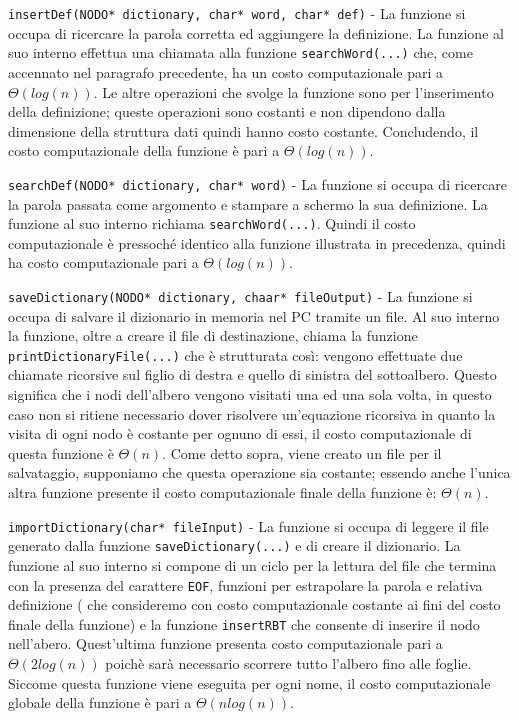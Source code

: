 \documentclass[paper=a4, fontsize=11pt,twoside]{scrartcl}   %
\begin{document}
				\texttt{insertDef(NODO* dictionary, char* word, char* def)} - La funzione si occupa di ricercare la parola corretta ed aggiungere la definizione. La funzione al suo interno effettua una chiamata alla funzione \texttt{searchWord(...)} che, come accennato nel paragrafo precedente, ha un costo computazionale pari a $\Theta(log(n))$. Le altre operazioni che svolge la funzione sono per l'inserimento della definizione; queste operazioni sono costanti e non dipendono dalla dimensione della struttura dati quindi hanno costo costante. Concludendo, il costo computazionale della funzione è pari a $\Theta(log(n))$.\par
				
				\texttt{searchDef(NODO* dictionary, char* word)} - La funzione si occupa di ricercare la parola passata come argomento e stampare a schermo la sua definizione. La funzione al suo interno richiama \texttt{searchWord(...)}. Quindi il costo computazionale è pressoché identico alla funzione illustrata in precedenza, quindi ha costo computazionale pari a $\Theta(log(n))$.\par
				
				\texttt{saveDictionary(NODO* dictionary, chaar* fileOutput)} - La funzione si occupa di salvare il dizionario in memoria nel PC tramite un file. Al suo interno la funzione, oltre a creare il file di destinazione, chiama la funzione \texttt{printDictionaryFile(...)} che è strutturata così: vengono effettuate due chiamate ricorsive sul figlio di destra e quello di sinistra del sottoalbero. Questo significa che i nodi dell'albero vengono visitati una ed una sola volta, in questo caso non si ritiene necessario dover risolvere un'equazione ricorsiva in quanto la visita di ogni nodo è costante per ognuno di essi, il costo computazionale di questa funzione è $\Theta(n)$. Come detto sopra, viene creato un file per il salvataggio, supponiamo che questa operazione sia costante; essendo anche l'unica altra funzione presente il costo computazionale finale della funzione è: $\Theta(n)$.\par
				
				\texttt{importDictionary(char* fileInput)} - La funzione si occupa di leggere il file generato dalla funzione \texttt{saveDictionary(...)} e di creare il dizionario. La funzione al suo interno si compone di un ciclo per la lettura del file che termina con la presenza del carattere \texttt{EOF}, funzioni per estrapolare la parola e relativa definizione ( che consideremo con costo computazionale costante ai fini del costo finale della funzione) e la funzione \texttt{insertRBT} che consente di inserire il nodo nell'abero. Quest'ultima funzione presenta costo computazionale pari a $\Theta(2log(n))$ poichè sarà necessario scorrere tutto l'albero fino alle foglie. Siccome questa funzione viene eseguita per ogni nome, il costo computazionale globale della funzione è pari a $\Theta(nlog(n))$.\par 
				
\end{document}
